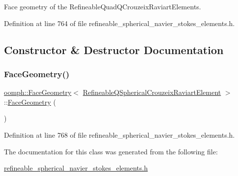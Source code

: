 Face geometry of the Refineable\+Quad\+Q\+Crouzeix\+Raviart\+Elements. 

Definition at line 764 of file refineable\+\_\+spherical\+\_\+navier\+\_\+stokes\+\_\+elements.\+h.



\subsection{Constructor \& Destructor Documentation}
\mbox{\label{classoomph_1_1FaceGeometry_3_01RefineableQSphericalCrouzeixRaviartElement_01_4_a4c226446f229c15f61393ed6ddd2fc7a}} 
\subsubsection{\texorpdfstring{Face\+Geometry()}{FaceGeometry()}}
{\footnotesize\ttfamily \hyperlink{classoomph_1_1FaceGeometry}{oomph\+::\+Face\+Geometry}$<$ \hyperlink{classoomph_1_1RefineableQSphericalCrouzeixRaviartElement}{Refineable\+Q\+Spherical\+Crouzeix\+Raviart\+Element} $>$\+::\hyperlink{classoomph_1_1FaceGeometry}{Face\+Geometry} (\begin{DoxyParamCaption}{ }\end{DoxyParamCaption})\hspace{0.3cm}{\ttfamily [inline]}}



Definition at line 768 of file refineable\+\_\+spherical\+\_\+navier\+\_\+stokes\+\_\+elements.\+h.



The documentation for this class was generated from the following file\+:\begin{DoxyCompactItemize}
\item 
\hyperlink{refineable__spherical__navier__stokes__elements_8h}{refineable\+\_\+spherical\+\_\+navier\+\_\+stokes\+\_\+elements.\+h}\end{DoxyCompactItemize}
